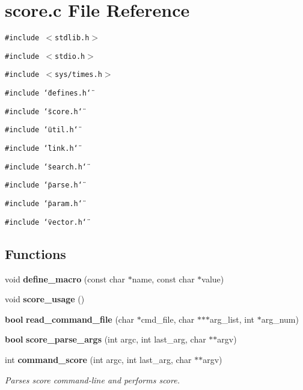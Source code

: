 \section{score.c File Reference}
\label{score_8c}
{\tt \#include $<$stdlib.h$>$}\par
{\tt \#include $<$stdio.h$>$}\par
{\tt \#include $<$sys/times.h$>$}\par
{\tt \#include \char`\"{}defines.h\char`\"{}}\par
{\tt \#include \char`\"{}score.h\char`\"{}}\par
{\tt \#include \char`\"{}util.h\char`\"{}}\par
{\tt \#include \char`\"{}link.h\char`\"{}}\par
{\tt \#include \char`\"{}search.h\char`\"{}}\par
{\tt \#include \char`\"{}parse.h\char`\"{}}\par
{\tt \#include \char`\"{}param.h\char`\"{}}\par
{\tt \#include \char`\"{}vector.h\char`\"{}}\par
\subsection*{Functions}
\begin{CompactItemize}
\item 
void {\bf define\_\-macro} (const char $\ast$name, const char $\ast$value)
\item 
void {\bf score\_\-usage} ()
\item 
{\bf bool} {\bf read\_\-command\_\-file} (char $\ast$cmd\_\-file, char $\ast$$\ast$$\ast$arg\_\-list, int $\ast$arg\_\-num)
\item 
{\bf bool} {\bf score\_\-parse\_\-args} (int argc, int last\_\-arg, char $\ast$$\ast$argv)
\item 
int {\bf command\_\-score} (int argc, int last\_\-arg, char $\ast$$\ast$argv)
\begin{CompactList}\small\item\em Parses score command-line and performs score. \item\end{CompactList}\end{CompactItemize}
